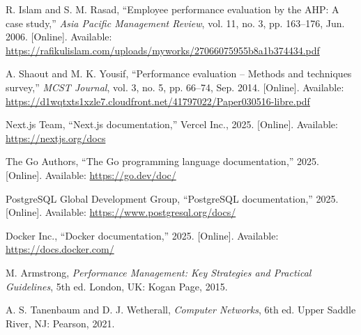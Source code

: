 
\singlespace
{}
\begin{thebibliography}{}
	R. Islam and S. M. Rasad, ``Employee performance evaluation by the AHP: A case study,'' \emph{Asia Pacific Management Review}, vol. 11, no. 3, pp. 163--176, Jun. 2006. [Online]. Available: \url{https://rafikulislam.com/uploads/myworks/27066075955b8a1b374434.pdf}

	A. Shaout and M. K. Yousif, ``Performance evaluation – Methods and techniques survey,'' \emph{MCST Journal}, vol. 3, no. 5, pp. 66--74, Sep. 2014. [Online]. Available: \url{https://d1wqtxts1xzle7.cloudfront.net/41797022/Paper030516-libre.pdf}

	Next.js Team, ``Next.js documentation,'' Vercel Inc., 2025. [Online]. Available: \url{https://nextjs.org/docs}

	The Go Authors, ``The Go programming language documentation,'' 2025. [Online]. Available: \url{https://go.dev/doc/}

	PostgreSQL Global Development Group, ``PostgreSQL documentation,'' 2025. [Online]. Available: \url{https://www.postgresql.org/docs/}

	Docker Inc., ``Docker documentation,'' 2025. [Online]. Available: \url{https://docs.docker.com/}

	M. Armstrong, \emph{Performance Management: Key Strategies and Practical Guidelines}, 5th ed. London, UK: Kogan Page, 2015.

	A. S. Tanenbaum and D. J. Wetherall, \emph{Computer Networks}, 6th ed. Upper Saddle River, NJ: Pearson, 2021.

\end{thebibliography}